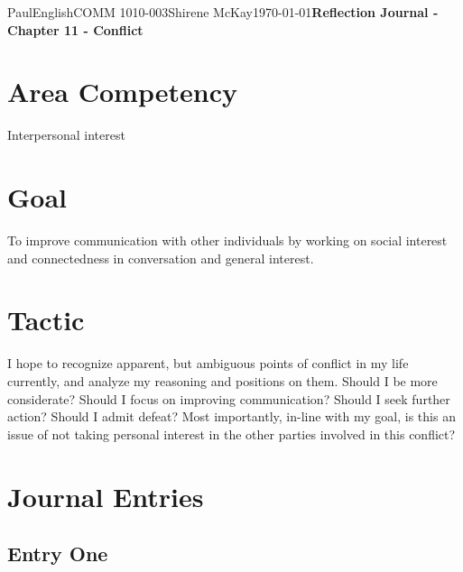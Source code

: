 \documentclass[12pt,letterpaper]{article}
\begin{document}
\begin{mla}{Paul}{English}{COMM 1010-003}{Shirene
    McKay}{\today}{\textbf{Reflection Journal - Chapter 11 - Conflict}}
    
\section{Area Competency}

Interpersonal interest 

\section{Goal}

To improve communication with other individuals by working on social interest and connectedness in conversation and general interest.

\section{Tactic}

I hope to recognize apparent, but ambiguous points of conflict in my life currently, and analyze my reasoning and positions on them. Should I be more considerate? Should I focus on improving communication? Should I seek further action? Should I admit defeat? Most importantly, in-line with my goal, is this an issue of not taking personal interest in the other parties involved in this conflict?

\section{Journal Entries}

\subsection{Entry One}


\end{mla}
\end{document}
